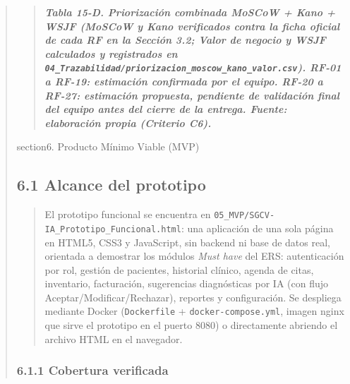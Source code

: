\documentclass[
]{article}
\begin{document}
\begin{quote}
\begin{quote}
\protect{}\label{table15d}{}\emph{\textbf{Tabla 15-D. Priorización
combinada MoSCoW + Kano + WSJF (MoSCoW y Kano verificados contra la ficha
oficial de cada RF en la Sección 3.2; Valor de negocio y WSJF calculados y
registrados en \texttt{04\_Trazabilidad/priorizacion\_moscow\_kano\_valor.csv}).
RF-01 a RF-19: estimación confirmada por el equipo. RF-20 a RF-27:
estimación propuesta, pendiente de validación final del equipo antes del
cierre de la entrega. Fuente: elaboración propia (Criterio C6).}}
\end{quote}



section{6. Producto Mínimo Viable (MVP)}\label{producto-minimo-viable-mvp}

\subsection{6.1 Alcance del prototipo}\label{s6-1-alcance-del-prototipo}

\begin{quote}
El prototipo funcional se encuentra en
\texttt{05\_MVP/SGCV-IA\_Prototipo\_Funcional.html}: una aplicación de una
sola página en HTML5, CSS3 y JavaScript, sin backend ni base de datos
real, orientada a demostrar los módulos \emph{Must have} del ERS:
autenticación por rol, gestión de pacientes, historial clínico, agenda
de citas, inventario, facturación, sugerencias diagnósticas por IA (con
flujo Aceptar/Modificar/Rechazar), reportes y configuración. Se
despliega mediante Docker (\texttt{Dockerfile} + \texttt{docker-compose.yml},
imagen nginx que sirve el prototipo en el puerto 8080) o directamente
abriendo el archivo HTML en el navegador.
\end{quote}

\subsubsection{6.1.1 Cobertura verificada}\label{s6-1-1-cobertura-verificada}


\end{quote}
\end{document}
